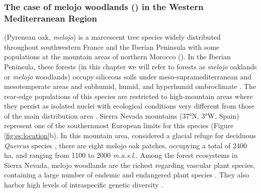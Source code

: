 \subsubsection{The case of melojo woodlands (\Qpy) in the Western Mediterranean Region}\label{sec:es:intro-qp}
\Qpw (Pyrenean oak, \emph{melojo}) is a marcescent tree species widely distributed throughout southwestern France and the Iberian Peninsula with some populations at the mountain areas of northern Morocco \autocites{Franco1990Quercus} (). In the Iberian Peninsula, these forests (in this chapter we will refer to \Qpy forests as \emph{melojo} oaklands or \emph{melojo} woodlands) occupy siliceous soils under meso-supramediterranean and mesotemperate areas and subhumid, humid, and hyperhumid ombroclimate \autocites{delaSernaetal2016MarcescentQuercus,Gavilanetal2018SclerophyllousDeciduous}. The rear-edge populations of this species are restricted to high-mountain areas where they persist as isolated nuclei with ecological conditions very different from those of the main distribution area \autocites{PerezLuqueetal2021EcologicalDiversity}. Sierra Nevada mountains (37°N, 3°W, Spain) represent one of the southernmost European limits for this species (Figure \ref{fig:es:location}b). In this mountain area, considered a glacial refuge for deciduous \emph{Quercus} species \autocite{Olaldeetal2002WhiteOaks}, there are eight melojo oak patches, occupying a total of 2400 ha, and ranging from 1100 to 2000 \emph{m.a.s.l.}. Among the forest ecosystems in Sierra Nevada, melojo woodlands are the richest regarding vascular plant species, containing a large number of endemic and endangered plant species \autocite{Loriteetal2008PhytosociologicalReview}. They also harbor high levels of intraspecific genetic diversity \autocite{ValbuenaCarabanaGil2013GeneticResilience,ValbuenaCarabanaGil2017CentenaryCoppicing}. 

